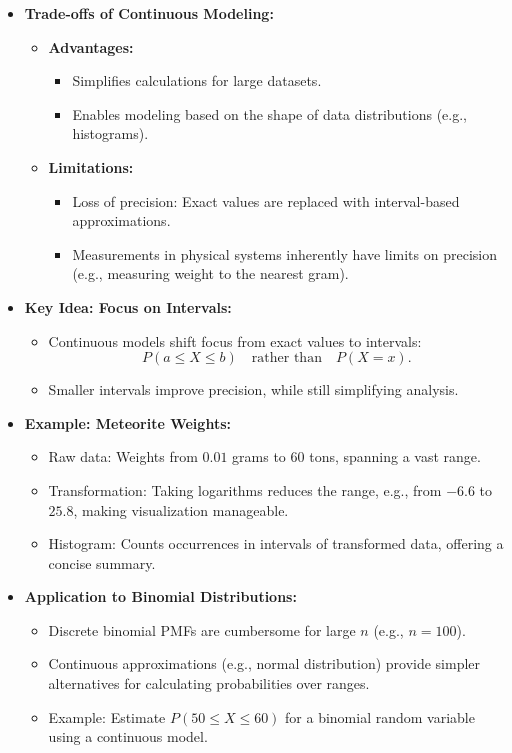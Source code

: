 \documentclass{article}
\begin{document}
\begin{itemize}
  \item \textbf{Trade-offs of Continuous Modeling:}
    \begin{itemize}
      \item \textbf{Advantages:}
        \begin{itemize}
          \item Simplifies calculations for large datasets.
          \item Enables modeling based on the shape of data distributions (e.g., histograms).
        \end{itemize}
      \item \textbf{Limitations:}
        \begin{itemize}
          \item Loss of precision: Exact values are replaced with interval-based approximations.
          \item Measurements in physical systems inherently have limits on precision (e.g., measuring weight to the nearest gram).
        \end{itemize}
    \end{itemize}

  \item \textbf{Key Idea: Focus on Intervals:}
    \begin{itemize}
      \item Continuous models shift focus from exact values to intervals:
        \[
          P(a \leq X \leq b) \quad \text{rather than} \quad P(X = x).
        \]
      \item Smaller intervals improve precision, while still simplifying analysis.
    \end{itemize}

  \item \textbf{Example: Meteorite Weights:}
    \begin{itemize}
      \item Raw data: Weights from $0.01$ grams to $60$ tons, spanning a vast range.
      \item Transformation: Taking logarithms reduces the range, e.g., from $-6.6$ to $25.8$, making visualization manageable.
      \item Histogram: Counts occurrences in intervals of transformed data, offering a concise summary.
    \end{itemize}

  \item \textbf{Application to Binomial Distributions:}
    \begin{itemize}
      \item Discrete binomial PMFs are cumbersome for large $n$ (e.g., $n = 100$).
      \item Continuous approximations (e.g., normal distribution) provide simpler alternatives for calculating probabilities over ranges.
      \item Example: Estimate $P(50 \leq X \leq 60)$ for a binomial random variable using a continuous model.
    \end{itemize}
\end{itemize}
\end{document}

